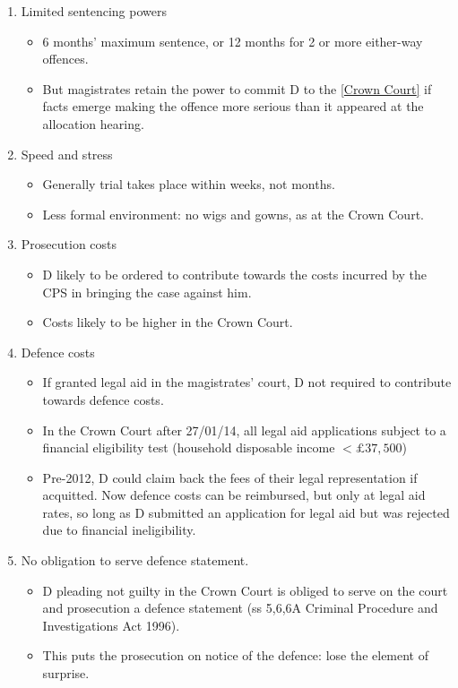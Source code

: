 \documentclass[
]{article}
\providecommand{\tightlist}{%
  \setlength{\itemsep}{0pt}\setlength{\parskip}{0pt}}
\begin{document}
\begin{enumerate}
\def\labelenumi{\arabic{enumi}.}
\tightlist
\item
  Limited sentencing powers

  \begin{itemize}
  \tightlist
  \item
    6 months' maximum sentence, or 12 months for 2 or more either-way
    offences.
  \item
    But magistrates retain the power to commit D to the
    \href{no\%20financial\%20limit.}{{[}Crown Court{]}} if facts emerge
    making the offence more serious than it appeared at the allocation
    hearing.
  \end{itemize}
\item
  Speed and stress

  \begin{itemize}
  \tightlist
  \item
    Generally trial takes place within weeks, not months.
  \item
    Less formal environment: no wigs and gowns, as at the Crown Court.
  \end{itemize}
\item
  Prosecution costs

  \begin{itemize}
  \tightlist
  \item
    D likely to be ordered to contribute towards the costs incurred by
    the CPS in bringing the case against him.
  \item
    Costs likely to be higher in the Crown Court.
  \end{itemize}
\item
  Defence costs

  \begin{itemize}
  \tightlist
  \item
    If granted legal aid in the magistrates' court, D not required to
    contribute towards defence costs.
  \item
    In the Crown Court after 27/01/14, all legal aid applications
    subject to a financial eligibility test (household disposable income
    \(<£37,500\))
  \item
    Pre-2012, D could claim back the fees of their legal representation
    if acquitted. Now defence costs can be reimbursed, but only at legal
    aid rates, so long as D submitted an application for legal aid but
    was rejected due to financial ineligibility.
  \end{itemize}
\item
  No obligation to serve defence statement.

  \begin{itemize}
  \tightlist
  \item
    D pleading not guilty in the Crown Court is obliged to serve on the
    court and prosecution a defence statement (ss 5,6,6A Criminal
    Procedure and Investigations Act 1996).
  \item
    This puts the prosecution on notice of the defence: lose the element
    of surprise.
  \end{itemize}
\end{enumerate}
\end{document}
